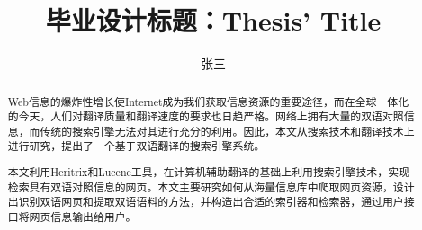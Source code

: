 \documentclass{swjtuthesis}
\begin{document}


\title{毕业设计标题：Thesis' Title}
\author{张三}
\maketitlepage

\makeais
\makecua
\makeevaluatepage
\makescorepage
\maketaskpage

\startabstract
{}
\begin{abstract}
    Web信息的爆炸性增长使Internet成为我们获取信息资源的重要途径，而在全球一体化的今天，人们对翻译质量和翻译速度的要求也日趋严格。网络上拥有大量的双语对照信息，而传统的搜索引擎无法对其进行充分的利用。因此，本文从搜索技术和翻译技术上进行研究，提出了一个基于双语翻译的搜索引擎系统。

    本文利用Heritrix和Lucene工具，在计算机辅助翻译的基础上利用搜索引擎技术，实现检索具有双语对照信息的网页。本文主要研究如何从海量信息库中爬取网页资源，设计出识别双语网页和提取双语语料的方法，并构造出合适的索引器和检索器，通过用户接口将网页信息输出给用户。   
\end{abstract}
\end{document}

